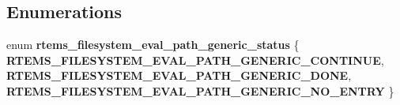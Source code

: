 \subsection*{Enumerations}
\begin{DoxyCompactItemize}
\item 
\mbox{\label{group__LibIOInternal_ga35c9ceafafba9bc85ceb49e6361d88db}} 
enum {\bfseries rtems\+\_\+filesystem\+\_\+eval\+\_\+path\+\_\+generic\+\_\+status} \{ {\bfseries R\+T\+E\+M\+S\+\_\+\+F\+I\+L\+E\+S\+Y\+S\+T\+E\+M\+\_\+\+E\+V\+A\+L\+\_\+\+P\+A\+T\+H\+\_\+\+G\+E\+N\+E\+R\+I\+C\+\_\+\+C\+O\+N\+T\+I\+N\+UE}, 
{\bfseries R\+T\+E\+M\+S\+\_\+\+F\+I\+L\+E\+S\+Y\+S\+T\+E\+M\+\_\+\+E\+V\+A\+L\+\_\+\+P\+A\+T\+H\+\_\+\+G\+E\+N\+E\+R\+I\+C\+\_\+\+D\+O\+NE}, 
{\bfseries R\+T\+E\+M\+S\+\_\+\+F\+I\+L\+E\+S\+Y\+S\+T\+E\+M\+\_\+\+E\+V\+A\+L\+\_\+\+P\+A\+T\+H\+\_\+\+G\+E\+N\+E\+R\+I\+C\+\_\+\+N\+O\+\_\+\+E\+N\+T\+RY}
 \}
\end{DoxyCompactItemize}
